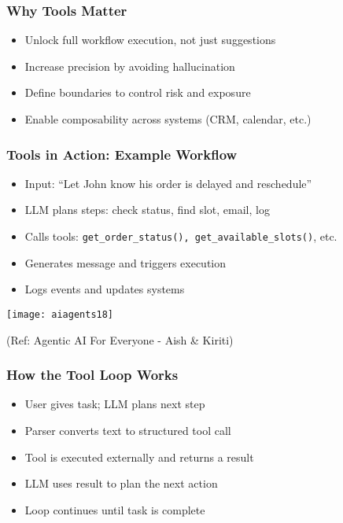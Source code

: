 \begin{frame}[fragile]\frametitle{Why Tools Matter}
      \begin{itemize}
        \item Unlock full workflow execution, not just suggestions
        \item Increase precision by avoiding hallucination
        \item Define boundaries to control risk and exposure
        \item Enable composability across systems (CRM, calendar, etc.)
      \end{itemize}
\end{frame}

\begin{frame}[fragile]\frametitle{Tools in Action: Example Workflow}
      \begin{itemize}
        \item Input: ``Let John know his order is delayed and reschedule''
        \item LLM plans steps: check status, find slot, email, log
        \item Calls tools: \lstinline|get_order_status(), get_available_slots()|, etc.
        \item Generates message and triggers execution
        \item Logs events and updates systems
      \end{itemize}
	  
		\begin{center}
		\texttt{[image: aiagents18]}
		
		{\tiny (Ref: Agentic AI For Everyone - Aish \& Kiriti)}
		\end{center}	  
\end{frame}

\begin{frame}[fragile]\frametitle{How the Tool Loop Works}
      \begin{itemize}
        \item User gives task; LLM plans next step
        \item Parser converts text to structured tool call
        \item Tool is executed externally and returns a result
        \item LLM uses result to plan the next action
        \item Loop continues until task is complete
      \end{itemize}
\end{frame}

